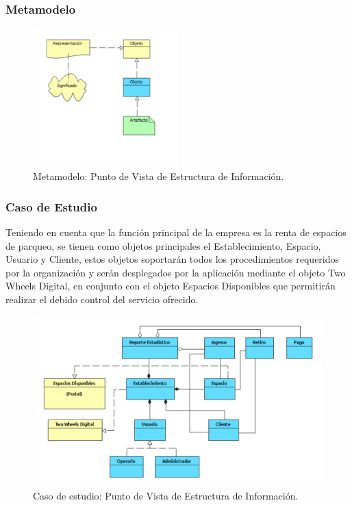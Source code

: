 \subsubsection{Metamodelo}
\begin{figure}[h]
	\centering
	\includegraphics[width=0.5\textwidth]{imagenes/Metamodelos/Tecnologia/meta_estructura_informacion.PDF}
	\caption{Metamodelo: Punto de Vista de Estructura de Información.}
	\label{fig:gap_analysis}
\end{figure}

\subsubsection{Caso de Estudio}
Teniendo en cuenta que la función principal de la empresa es la renta de espacios de parqueo, se tienen como objetos principales el Establecimiento, Espacio, Usuario y Cliente, estos objetos soportarán todos los procedimientos requeridos por la organización y serán desplegados por la aplicación mediante el objeto Two Wheels Digital, en conjunto con el objeto Espacios Disponibles que permitirán realizar el debido control del servicio ofrecido.

\begin{figure}[h]
	\centering
	\includegraphics[width=1.0\textwidth]{imagenes/Caso_Estudio/Tecnologia/estructura_informacion.PDF}
	\caption{Caso de estudio: Punto de Vista de Estructura de Información.}
	\label{fig:gap_analysis}
\end{figure}


